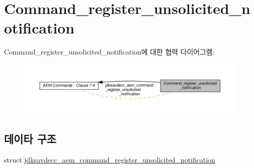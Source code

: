 \hypertarget{group__command__register__unsolicited__notification}{}\section{Command\+\_\+register\+\_\+unsolicited\+\_\+notification}
\label{group__command__register__unsolicited__notification}
Command\+\_\+register\+\_\+unsolicited\+\_\+notification에 대한 협력 다이어그램\+:
\nopagebreak
\begin{figure}[H]
\begin{center}
\leavevmode
\includegraphics[width=350pt]{group__command__register__unsolicited__notification}
\end{center}
\end{figure}
\subsection*{데이타 구조}
\begin{DoxyCompactItemize}
\item 
struct \hyperlink{structjdksavdecc__aem__command__register__unsolicited__notification}{jdksavdecc\+\_\+aem\+\_\+command\+\_\+register\+\_\+unsolicited\+\_\+notification}
\end{DoxyCompactItemize}
